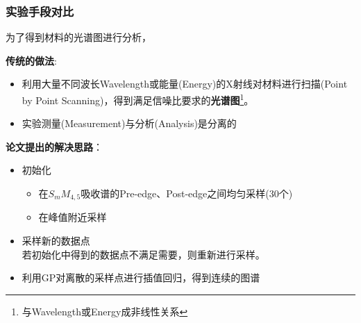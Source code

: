 \documentclass{beamer}
\begin{document}
\begin{frame}
\frametitle{实验手段对比}
为了得到材料的光谱图进行分析，

\textbf{传统的做法}:
\begin{itemize}
\item 利用大量不同波长Wavelength或能量(Energy)的X射线对材料进行扫描(Point by Point Scanning)，得到满足信噪比要求的\textbf{光谱图}\footnote{与Wavelength或Energy成非线性关系}。
\item 实验测量(Measurement)与分析(Analysis)是分离的
\end{itemize}
\textbf{论文提出的解决思路}：
\begin{itemize}
\item 初始化
\begin{itemize}
\item 在$S_m M_{4,5}$吸收谱的Pre-edge、Post-edge之间均匀采样(30个)
\item 在峰值附近采样
\end{itemize}
\item 采样新的数据点 \\
若初始化中得到的数据点不满足需要，则重新进行采样。
\item 利用GP对离散的采样点进行插值回归，得到连续的图谱
\end{itemize}

\end{frame}
\end{document}
